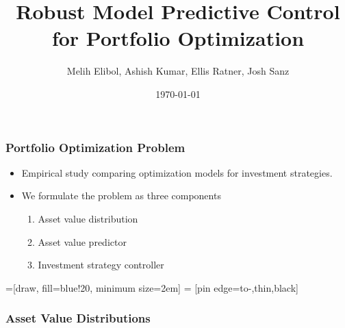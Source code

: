 \documentclass{beamer}
\title[Robust MPC for Portfolio Optimization]{Robust Model Predictive Control for Portfolio Optimization} %
\author[M. Elibol, A. Kumar, E. Ratner, J. Sanz]{Melih Elibol, Ashish Kumar, Ellis Ratner, Josh Sanz} %
\institute[] %
{
\medskip
}
\date{\today} %
\begin{document}
\begin{frame}
\titlepage %
\end{frame}

\begin{frame}
\frametitle{Portfolio Optimization Problem}

    \begin{itemize}
    \item Empirical study comparing optimization models for investment strategies.
    \item We formulate the problem as three components
        \begin{enumerate}
        \item Asset value distribution

        \item Asset value predictor

        \item Investment strategy controller
        \end{enumerate}
    \end{itemize}

    =[draw, fill=blue!20, minimum size=2em]
 = [pin edge={to-,thin,black}]

\begin{figure}
\centering
{}
\end{figure}

\end{frame}

\begin{frame}
\frametitle{Asset Value Distributions}


\end{frame}
\end{document}
